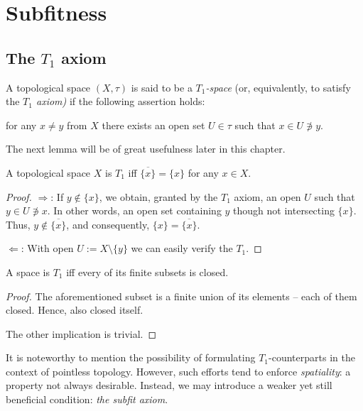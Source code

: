 \chapter{Subfitness}

\section{The $T_1$ axiom}

\begin{df}[$T_1$]
  A topological space $(X, \tau)$ is said to be a {\sl $T_1$-space\/} (or,
  equivalently, to satisfy the {\sl $T_1$ axiom)\/} if the following assertion
  holds:
  \begin{center}
    for any $x \ne y$ from $X$ there exists an open set $U\in \tau$ such that
    $x\in U \not\owns y$.
  \end{center}
\end{df}

The next lemma will be of great usefulness later in this chapter.

\begin{lem} \label{T1Char}
  A topological space $X$ is $T_1$ iff $\overline{\{x\}} = \{x\}$ for any $x\in
  X$.
\end{lem}

\begin{proof}
  $\Rightarrow$: If $y\not\in \{x\}$, we obtain, granted by the $T_1$ axiom,
  an open $U$ such that $y\in U\not\owns x$.
  In other words, an open set containing $y$ though not intersecting $\{x\}$.
  Thus, $y\not\in \overline{\{x\}}$, and consequently, $\{x\} =
  \overline{\{x\}}$.

  $\Leftarrow$: With open $U:= X\setminus \{y\}$ we can easily verify the
  $T_1$.
\end{proof}

\begin{cor}
  A space is $T_1$ iff every of its finite subsets is closed.
\end{cor}

\begin{proof}
  The aforementioned subset is a finite union of its elements -- each of them closed.
  Hence, also closed itself.

  The other implication is trivial.
\end{proof}

It is noteworthy to mention the possibility of formulating $T_1$-counterparts
in the context of pointless topology.
However, such efforts tend to enforce {\sl spatiality\/}: a property not always
desirable.
Instead, we may introduce a weaker yet still beneficial condition: {\sl the
subfit axiom\/}.

